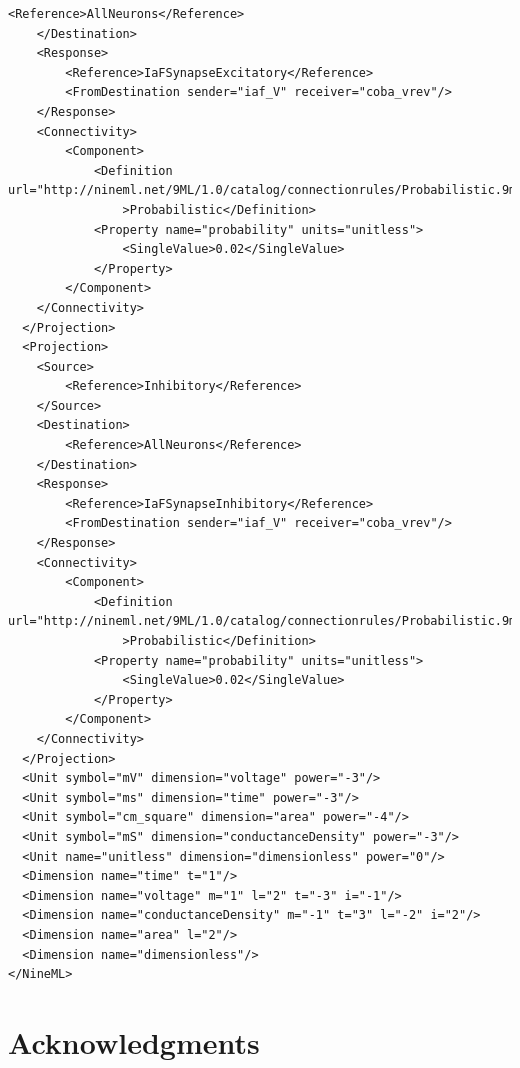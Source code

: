 \documentclass[draftspec]{ninemlspec}
\begin{document}
\begin{lstlisting}[style=XML]
  		<Reference>AllNeurons</Reference>
  	</Destination>
  	<Response>
  		<Reference>IaFSynapseExcitatory</Reference>
  		<FromDestination sender="iaf_V" receiver="coba_vrev"/>
  	</Response>
  	<Connectivity>
  		<Component>
			<Definition url="http://nineml.net/9ML/1.0/catalog/connectionrules/Probabilistic.9ml"
				>Probabilistic</Definition>
			<Property name="probability" units="unitless">
				<SingleValue>0.02</SingleValue>
			</Property>
		</Component>
  	</Connectivity>
  </Projection>
  <Projection>
  	<Source>
  		<Reference>Inhibitory</Reference>
  	</Source>
  	<Destination>
  		<Reference>AllNeurons</Reference>
  	</Destination>
  	<Response>
  		<Reference>IaFSynapseInhibitory</Reference>
  		<FromDestination sender="iaf_V" receiver="coba_vrev"/>
  	</Response>
  	<Connectivity>
  		<Component>
			<Definition url="http://nineml.net/9ML/1.0/catalog/connectionrules/Probabilistic.9ml"
				>Probabilistic</Definition>
			<Property name="probability" units="unitless">
				<SingleValue>0.02</SingleValue>
			</Property>				
		</Component>
  	</Connectivity>
  </Projection>
  <Unit symbol="mV" dimension="voltage" power="-3"/>
  <Unit symbol="ms" dimension="time" power="-3"/>
  <Unit symbol="cm_square" dimension="area" power="-4"/>
  <Unit symbol="mS" dimension="conductanceDensity" power="-3"/>
  <Unit name="unitless" dimension="dimensionless" power="0"/>
  <Dimension name="time" t="1"/>
  <Dimension name="voltage" m="1" l="2" t="-3" i="-1"/>
  <Dimension name="conductanceDensity" m="-1" t="3" l="-2" i="2"/>
  <Dimension name="area" l="2"/>
  <Dimension name="dimensionless"/>
</NineML>
\end{lstlisting}

\section{Acknowledgments}
\end{document}
